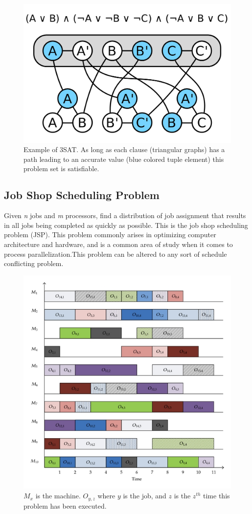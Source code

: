 \documentclass[10pt,twoside]{IEEEtran}
\begin{document}
\begin{figure}[h]
	\centering
	\includegraphics[width=0.7\linewidth]{../diagrams/3sat.png}
	\caption{Example of 3SAT. As long as each clause (triangular graphs) has a path leading to an accurate value (blue colored tuple element) this problem set is satisfiable.}
	\label{3SAT fig}
\end{figure}

\subsection{Job Shop Scheduling Problem}
Given \emph{n} jobs and \emph{m} processors, find a distribution of job assignment that results in all jobs being completed as quickly as possible. This is the job shop scheduling problem (JSP). This problem commonly arises in optimizing computer architecture and hardware, and is a common area of study when it comes to process parallelization.This problem can be altered to any sort of schedule conflicting problem.

\begin{figure}[h]
	\centering
	\includegraphics[width=0.7\linewidth]{../diagrams/jsp.jpg}
	\caption{$M_{x}$ is the machine. $O_{y,z}$ where $y$ is the job, and $z$ is the $z^{th}$ time this problem has been executed.}
	\label{JSS Fig}
\end{figure}
\end{document}
